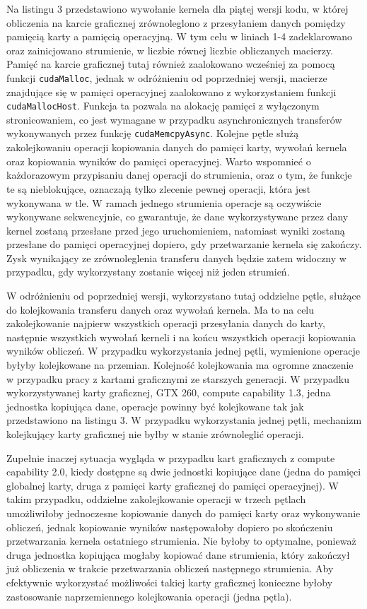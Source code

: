 \documentclass[12pt,a4paper]{article}
\begin{document}
Na listingu 3 przedstawiono wywołanie kernela dla piątej wersji kodu, w której obliczenia na karcie graficznej zrównoleglono z przesyłaniem danych pomiędzy pamięcią karty a pamięcią operacyjną. W tym celu w liniach 1-4 zadeklarowano oraz zainicjowano strumienie, w liczbie równej liczbie obliczanych macierzy. Pamięć na karcie graficznej tutaj również zaalokowano wcześniej za pomocą funkcji \verb|cudaMalloc|, jednak w odróżnieniu od poprzedniej wersji, macierze znajdujące się w pamięci operacyjnej zaalokowano z wykorzystaniem funkcji \verb|cudaMallocHost|. Funkcja ta pozwala na alokację pamięci z wyłączonym stronicowaniem, co jest wymagane w przypadku asynchronicznych transferów wykonywanych przez funkcję \verb|cudaMemcpyAsync|. Kolejne pętle służą zakolejkowaniu operacji kopiowania danych do pamięci karty, wywołań kernela oraz kopiowania wyników do pamięci operacyjnej. Warto wspomnieć o każdorazowym przypisaniu danej operacji do strumienia, oraz o tym, że funkcje te są nieblokujące, oznaczają tylko zlecenie pewnej operacji, która jest wykonywana w tle. W ramach jednego strumienia operacje są oczywiście wykonywane sekwencyjnie, co gwarantuje, że dane wykorzystywane przez dany kernel zostaną przesłane przed jego uruchomieniem, natomiast wyniki zostaną przesłane do pamięci operacyjnej dopiero, gdy przetwarzanie kernela się zakończy. Zysk wynikający ze zrównoleglenia transferu danych będzie zatem widoczny w przypadku, gdy wykorzystany zostanie więcej niż jeden strumień.

W odróżnieniu od poprzedniej wersji, wykorzystano tutaj oddzielne pętle, służące do kolejkowania transferu danych oraz wywołań kernela. Ma to na celu zakolejkowanie najpierw wszystkich operacji przesyłania danych do karty, następnie wszystkich wywołań kerneli i na końcu wszystkich operacji kopiowania wyników obliczeń. W przypadku wykorzystania jednej pętli, wymienione operacje byłyby kolejkowane na przemian. Kolejność kolejkowania ma ogromne znaczenie w przypadku pracy z kartami graficznymi ze starszych generacji. W przypadku wykorzystywanej karty graficznej, GTX 260, compute capability 1.3, jedna jednostka kopiująca dane, operacje powinny być kolejkowane tak jak przedstawiono na listingu 3. W przypadku wykorzystania jednej pętli, mechanizm kolejkujący karty graficznej nie byłby w stanie zrównoleglić operacji.

Zupełnie inaczej sytuacja wygląda w przypadku kart graficznych z compute capability 2.0, kiedy dostępne są dwie jednostki kopiujące dane (jedna do pamięci globalnej karty, druga z pamięci karty graficznej do pamięci operacyjnej). W takim przypadku, oddzielne zakolejkowanie operacji w trzech pętlach umożliwiłoby jednoczesne kopiowanie danych do pamięci karty oraz wykonywanie obliczeń, jednak kopiowanie wyników następowałoby dopiero po skończeniu przetwarzania kernela ostatniego strumienia. Nie byłoby to optymalne, ponieważ druga jednostka kopiująca mogłaby kopiować dane strumienia, który zakończył już obliczenia w trakcie przetwarzania obliczeń następnego strumienia. Aby efektywnie wykorzystać możliwości takiej karty graficznej konieczne byłoby zastosowanie naprzemiennego kolejkowania operacji (jedna pętla).
\end{document}
